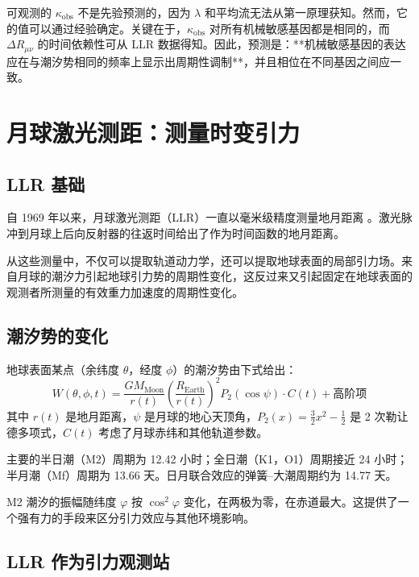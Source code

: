 \documentclass[12pt,a4paper]{article}
\theoremstyle{remark}
\begin{document}
	可观测的 \(\kappa_{\text{obs}}\) 不是先验预测的，因为 \(\lambda\) 和平均流无法从第一原理获知。然而，它的值可以通过经验确定。关键在于，\(\kappa_{\text{obs}}\) 对所有机械敏感基因都是相同的，而 \(\Delta R_{\mu\nu}\) 的时间依赖性可从 LLR 数据得知。因此，预测是：**机械敏感基因的表达应在与潮汐势相同的频率上显示出周期性调制**，并且相位在不同基因之间应一致。
	
	\section{月球激光测距：测量时变引力}
	\label{sec:llr}
	
	\subsection{LLR 基础}
	
	自 1969 年以来，月球激光测距（LLR）一直以毫米级精度测量地月距离 \cite{LLR-IfE}。激光脉冲到月球上后向反射器的往返时间给出了作为时间函数的地月距离。
	
	从这些测量中，不仅可以提取轨道动力学，还可以提取地球表面的局部引力场。来自月球的潮汐力引起地球引力势的周期性变化，这反过来又引起固定在地球表面的观测者所测量的有效重力加速度的周期性变化。
	
	\subsection{潮汐势的变化}
	
	地球表面某点（余纬度 \(\theta\)，经度 \(\phi\)）的潮汐势由下式给出：
	\begin{equation}
		W(\theta,\phi,t) = \frac{GM_{\text{Moon}}}{r(t)} \left(\frac{R_{\text{Earth}}}{r(t)}\right)^2 P_2(\cos\psi) \cdot C(t) + \text{高阶项}
		\label{eq:tidal-full}
	\end{equation}
	其中 \(r(t)\) 是地月距离，\(\psi\) 是月球的地心天顶角，\(P_2(x)=\frac{3}{2}x^2-\frac12\) 是 2 次勒让德多项式，\(C(t)\) 考虑了月球赤纬和其他轨道参数。
	
	主要的半日潮（M2）周期为 12.42 小时；全日潮（K1，O1）周期接近 24 小时；半月潮（Mf）周期为 13.66 天。日月联合效应的弹簧–大潮周期约为 14.77 天。
	
	M2 潮汐的振幅随纬度 \(\varphi\) 按 \(\cos^2\varphi\) 变化，在两极为零，在赤道最大。这提供了一个强有力的手段来区分引力效应与其他环境影响。
	
	\subsection{LLR 作为引力观测站}
	
\end{document}
